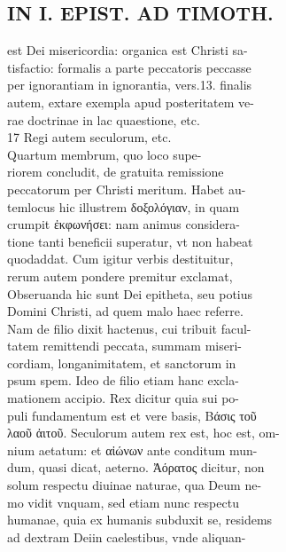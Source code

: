 \documentclass{article}
\begin{document}
\begin{pages}
\section*{IN I. EPIST. AD TIMOTH. \\
                }
est Dei misericordia: organica est Christi sa- \\
                tisfactio: formalis a parte peccatoris peccasse \\
                per ignorantiam in ignorantia, vers.13. finalis \\
                autem, extare exempla apud posteritatem ve- \\
                rae doctrinae in lac quaestione, etc. \\
                17 Regi autem seculorum, etc. \\
                Quartum membrum, quo loco supe- \\
                riorem concludit, de gratuita remissione \\
                peccatorum per Christi meritum. Habet au- \\
                temlocus hic illustrem δοξολόγιαν, in quam \\
                crumpit ἐκφωνήσει: nam animus considera- \\
                tione tanti beneficii superatur, vt non habeat \\
                quodaddat. Cum igitur verbis destituitur, \\
                rerum autem pondere premitur exclamat, \\
                Obseruanda hic sunt Dei epitheta, seu potius \\
                Domini Christi, ad quem malo haec referre. \\
                Nam de filio dixit hactenus, cui tribuit facul- \\
                tatem remittendi peccata, summam miseri- \\
                cordiam, longanimitatem, et sanctorum in \\
                psum spem. Ideo de filio etiam hanc excla- \\
                mationem accipio. Rex dicitur quia sui po- \\
                puli fundamentum est et vere basis, Βάσις τοῦ \\
                λαοῦ ἀιτοῦ. Seculorum autem rex est, hoc est, om- \\
                nium aetatum: et αἰώνων ante conditum mun- \\
                dum, quasi dicat, aeterno. Ἀόρατος dicitur, non \\
                solum respectu diuinae naturae, qua Deum ne- \\
                mo vidit vnquam, sed etiam nunc respectu \\
                humanae, quia ex humanis subduxit se, residems \\
                ad dextram Deiin caelestibus, vnde aliquan- \\
                

\end{pages}
\end{document}
